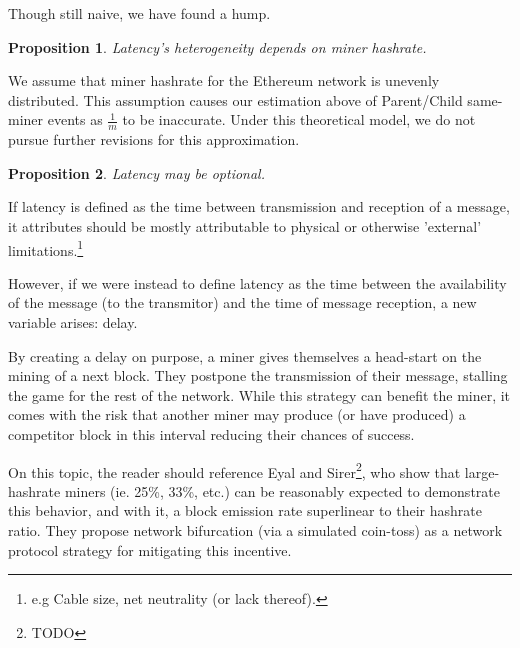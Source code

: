 \documentclass[11pt]{article}
\theoremstyle{plain}
\newtheorem{proposition}{Proposition}[section]
\begin{document}
Though still naive, we have found a hump.

\vspace{5mm}
\begin{proposition}
    Latency's heterogeneity depends on miner hashrate. %
\end{proposition}

We assume that miner hashrate for the Ethereum network is unevenly distributed.
This assumption causes our estimation above of Parent/Child same-miner events
as $\frac{1}{m}$ to be inaccurate.
Under this theoretical model, we do not pursue further revisions for this
approximation.

\vspace{5mm}
\begin{proposition}
    Latency may be optional.
\end{proposition}

If latency is defined as the time between transmission and reception of a
message, it attributes should be mostly attributable to physical or
otherwise 'external' limitations.\nolinebreak\footnote{
    e.g Cable size, net neutrality (or lack thereof).
}

However, if we were instead to define latency as the time between the availability
of the message (to the transmitor) and the time of message reception,
a new variable arises: delay.

By creating a delay on purpose, a miner gives themselves a head-start
on the mining of a next block. They postpone the transmission of their message,
stalling the game for the rest of the network. While this strategy can benefit
the miner, it comes with the risk that another miner may produce (or have
produced) a competitor block in this interval reducing their chances of success.

On this topic, the reader should reference Eyal and Sirer\footnote{TODO}, who
show that large-hashrate miners (ie. 25\%, 33\%, etc.) can be reasonably
expected to demonstrate this behavior, and with it, a block emission
rate superlinear to their hashrate ratio. They propose network bifurcation
(via a simulated coin-toss) as a network protocol strategy for mitigating
this incentive.
\end{document}
